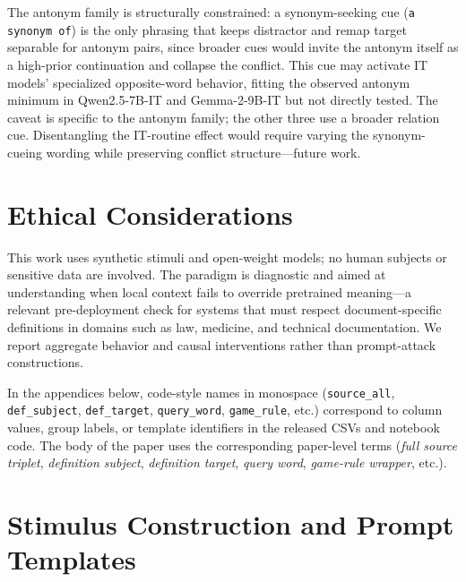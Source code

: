 \documentclass[11pt]{article}
\begin{document}
The antonym family is structurally constrained: a synonym-seeking cue (\texttt{a synonym of})
is the only phrasing that keeps distractor and remap target separable for antonym pairs,
since broader cues would invite the antonym itself as a high-prior continuation and collapse
the conflict. This cue may activate IT models' specialized opposite-word behavior, fitting
the observed antonym minimum in Qwen2.5-7B-IT and Gemma-2-9B-IT but not directly tested.
The caveat is specific to the antonym family; the other three use a broader relation cue.
Disentangling the IT-routine effect would require varying the synonym-cueing wording while
preserving conflict structure---future work.

\section*{Ethical Considerations}

This work uses synthetic stimuli and open-weight models; no human subjects or sensitive data are
involved. The paradigm is diagnostic and aimed at understanding when local context fails to
override pretrained meaning---a relevant pre-deployment check for systems that must respect
document-specific definitions in domains such as law, medicine, and technical documentation.
We report aggregate behavior and causal interventions rather than prompt-attack constructions.




\appendix

In the appendices below, code-style names in monospace (\texttt{source\_all},
\texttt{def\_subject}, \texttt{def\_target}, \texttt{query\_word}, \texttt{game\_rule}, etc.)
correspond to column values, group labels, or template identifiers in the released CSVs and
notebook code. The body of the paper uses the corresponding paper-level terms (\emph{full source
triplet}, \emph{definition subject}, \emph{definition target}, \emph{query word},
\emph{game-rule wrapper}, etc.).

\section{Stimulus Construction and Prompt Templates}
\label{app:stimuli}
\end{document}
